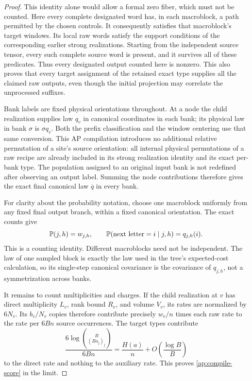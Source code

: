 \begin{proof}
This identity alone would allow a formal zero fiber, which must not be
counted.  Here every complete designated word has, in each macroblock,
a path permitted by the chosen controls.  It consequently satisfies that
macroblock's target windows.  Its local raw words satisfy the support
conditions of the corresponding earlier strong realizations.  Starting from
the independent source tensor, every such complete source word is present,
and it survives all of these predicates.  Thus every designated output
counted here is nonzero.  This also proves that every target assignment
of the retained exact type supplies all the claimed raw outputs, even
though the initial projection may correlate the unprocessed suffixes.

Bank labels are fixed physical orientations throughout.  At a node the
child realization supplies law \(q_v\) in canonical coordinates in each
bank; its physical law in bank \(\sigma\) is \(\sigma q_v\).
Both the prefix classification and the window centering use that same
conversion.  This AP compilation introduces no additional relative
permutation of a site's source orientation: all internal physical
permutations of a raw recipe are already included in its strong realization
identity and its exact per-bank type.  The population assigned to an
original input bank is not redefined after observing an output label.
Summing the node contributions therefore gives the exact final canonical
law \(\overline q\) in every bank.

For clarity about the probability notation, choose one macroblock uniformly
from any fixed final output branch, within a fixed canonical orientation.
The exact counts give
\[
 \mathbb P(j,h)=w_{j,h},
 \qquad
 \mathbb P(\text{next letter}=i\mid j,h)=q_{j,h}(i).
\]
This is a counting identity.  Different macroblocks need not be independent.
The law of one sampled block is exactly the law used in the tree's
expected-cost calculation, so its single-step canonical covariance is
the covariance of \(q_{j,h}\), not a symmetrization across banks.

It remains to count multiplicities and charges.  If the child realization
at \(v\) has direct multiplicity \(L_v\), rank bound \(R_v\), and
volume \(V_v\), its rates are normalized by \(6N_v\).  Its
\(b_v/N_v\) copies therefore contribute precisely \(w_v/n\) times
each raw rate to the rate per \(6Bn\) source occurrences.  The target
types contribute
\[
 \frac{6\log\binom B{(Ba_j)_j}}{6Bn}
  =\frac{H(a)}n+O\left(\frac{\log B}{B}\right)
\]
to the direct rate and nothing to the auxiliary rate.  This proves
\eqref{ap:compile-score} in the limit.


\end{proof}
